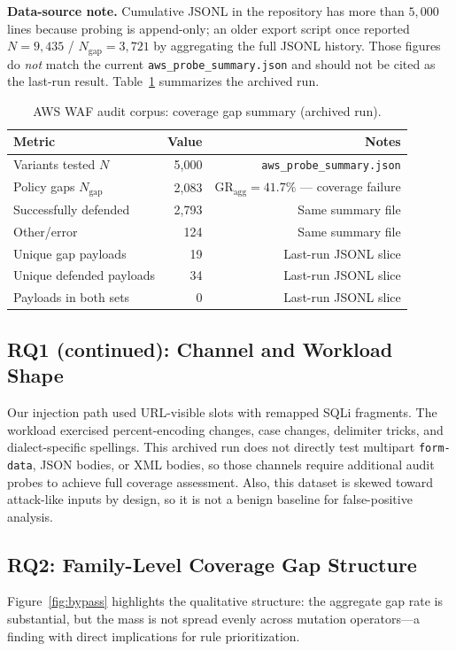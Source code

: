 \textbf{Data-source note.} Cumulative JSONL in the repository has more than $5{,}000$ lines because probing is append-only; an older export script once reported $N{=}9{,}435$ / $N_{\mathrm{gap}}{=}3{,}721$ by aggregating the full JSONL history. Those figures do \emph{not} match the current \texttt{aws\_probe\_summary.json} and should not be cited as the last-run result. Table~\ref{tab:dataset} summarizes the archived run.

\begin{table}[t]
  \centering
  \caption{AWS WAF audit corpus: coverage gap summary (archived run).}
  \label{tab:dataset}
  \begin{tabular}{lrr}
    \toprule
    Metric & Value & Notes \\
    \midrule
    Variants tested $N$ & 5{,}000 & \texttt{aws\_probe\_summary.json} \\
    Policy gaps $N_{\mathrm{gap}}$ & 2{,}083 & $\mathrm{GR}_{\mathrm{agg}}=41.7\%$ --- coverage failure \\
    Successfully defended & 2{,}793 & Same summary file \\
    Other/error & 124 & Same summary file \\
    Unique gap payloads & 19 & Last-run JSONL slice \\
    Unique defended payloads & 34 & Last-run JSONL slice \\
    Payloads in both sets & 0 & Last-run JSONL slice \\
    \bottomrule
  \end{tabular}
\end{table}

\subsection{RQ1 (continued): Channel and Workload Shape}
Our injection path used URL-visible slots with remapped SQLi fragments. The workload exercised percent-encoding changes, case changes, delimiter tricks, and dialect-specific spellings. This archived run does not directly test multipart \texttt{form-data}, JSON bodies, or XML bodies, so those channels require additional audit probes to achieve full coverage assessment. Also, this dataset is skewed toward attack-like inputs by design, so it is not a benign baseline for false-positive analysis.

\subsection{RQ2: Family-Level Coverage Gap Structure}
Figure~\ref{fig:bypass} highlights the qualitative structure: the aggregate gap rate is substantial, but the mass is not spread evenly across mutation operators---a finding with direct implications for rule prioritization.

